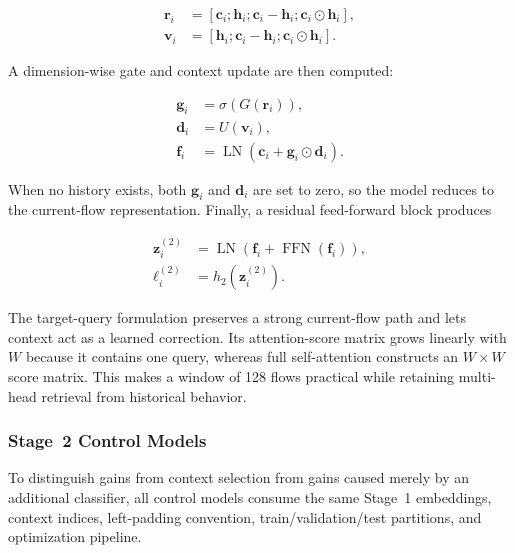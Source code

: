 \begin{align}
    \mathbf{r}_i
    &=[\mathbf{c}_i;\mathbf{h}_i;
       \mathbf{c}_i-\mathbf{h}_i;
       \mathbf{c}_i\odot\mathbf{h}_i],\\
    \mathbf{v}_i
    &=[\mathbf{h}_i;
       \mathbf{c}_i-\mathbf{h}_i;
       \mathbf{c}_i\odot\mathbf{h}_i].
    \label{eq:target_context_interactions}
\end{align}

A dimension-wise gate and context update are then computed:

\begin{align}
    \mathbf{g}_i&=\sigma(G(\mathbf{r}_i)),\\
    \mathbf{d}_i&=U(\mathbf{v}_i),\\
    \mathbf{f}_i&=\operatorname{LN}
      \left(\mathbf{c}_i+\mathbf{g}_i\odot\mathbf{d}_i\right).
    \label{eq:gated_context_update}
\end{align}

When no history exists, both $\mathbf{g}_i$ and $\mathbf{d}_i$ are set to zero,
so the model reduces to the current-flow representation. Finally, a residual
feed-forward block produces

\begin{align}
    \mathbf{z}^{(2)}_i
    &=\operatorname{LN}
      \left(
        \mathbf{f}_i+\operatorname{FFN}(\mathbf{f}_i)
      \right),\\
    \boldsymbol{\ell}^{(2)}_i
    &=h_2(\mathbf{z}^{(2)}_i).
    \label{eq:stage2_output}
\end{align}

The target-query formulation preserves a strong current-flow path and lets
context act as a learned correction. Its attention-score matrix grows linearly
with $W$ because it contains one query, whereas full self-attention constructs
an $W\times W$ score matrix. This makes a window of 128 flows practical while
retaining multi-head retrieval from historical behavior.

\subsubsection{Stage~2 Control Models}
\label{subsubsec:stage2_controls}

To distinguish gains from context selection from gains caused merely by an
additional classifier, all control models consume the same Stage~1 embeddings,
context indices, left-padding convention, train/validation/test partitions,
and optimization pipeline.

